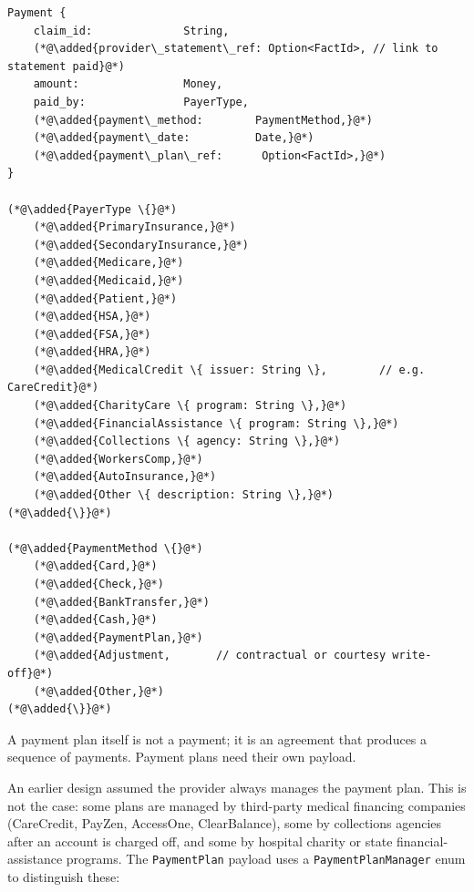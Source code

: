 \documentclass[11pt]{article}
\newcommand{\added}[1]{\textcolor{accentblue}{#1}}
\begin{document}
\begin{lstlisting}
Payment {
    claim_id:              String,
    (*@\added{provider\_statement\_ref: Option<FactId>, // link to statement paid}@*)
    amount:                Money,
    paid_by:               PayerType,
    (*@\added{payment\_method:        PaymentMethod,}@*)
    (*@\added{payment\_date:          Date,}@*)
    (*@\added{payment\_plan\_ref:      Option<FactId>,}@*)
}

(*@\added{PayerType \{}@*)
    (*@\added{PrimaryInsurance,}@*)
    (*@\added{SecondaryInsurance,}@*)
    (*@\added{Medicare,}@*)
    (*@\added{Medicaid,}@*)
    (*@\added{Patient,}@*)
    (*@\added{HSA,}@*)
    (*@\added{FSA,}@*)
    (*@\added{HRA,}@*)
    (*@\added{MedicalCredit \{ issuer: String \},        // e.g. CareCredit}@*)
    (*@\added{CharityCare \{ program: String \},}@*)
    (*@\added{FinancialAssistance \{ program: String \},}@*)
    (*@\added{Collections \{ agency: String \},}@*)
    (*@\added{WorkersComp,}@*)
    (*@\added{AutoInsurance,}@*)
    (*@\added{Other \{ description: String \},}@*)
(*@\added{\}}@*)

(*@\added{PaymentMethod \{}@*)
    (*@\added{Card,}@*)
    (*@\added{Check,}@*)
    (*@\added{BankTransfer,}@*)
    (*@\added{Cash,}@*)
    (*@\added{PaymentPlan,}@*)
    (*@\added{Adjustment,       // contractual or courtesy write-off}@*)
    (*@\added{Other,}@*)
(*@\added{\}}@*)
\end{lstlisting}

A payment plan itself is not a payment; it is an agreement that
produces a sequence of payments. Payment plans need their own payload.

An earlier design assumed the provider always manages the payment
plan. This is not the case: some plans are managed by third-party
medical financing companies (CareCredit, PayZen, AccessOne, ClearBalance),
some by collections agencies after an account is charged off, and some
by hospital charity or state financial-assistance programs. The
\texttt{PaymentPlan} payload uses a \texttt{PaymentPlanManager} enum
to distinguish these:
\end{document}
